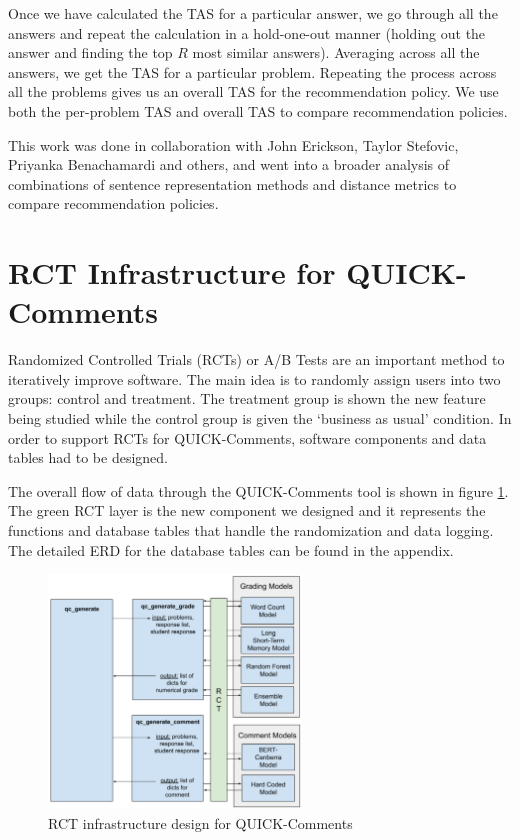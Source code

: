 \documentclass[12pt]{report}
\begin{document}
Once we have calculated the TAS for a particular answer, we go through all the answers and repeat the calculation in a hold-one-out manner (holding out the answer and finding the top $R$ most similar answers). Averaging across all the answers, we get the TAS for a particular problem. Repeating the process across all the problems gives us an overall TAS for the recommendation policy. We use both the per-problem TAS and overall TAS to compare recommendation policies.

This work was done in collaboration with John Erickson, Taylor Stefovic, Priyanka Benachamardi and others, and went into a broader analysis of combinations of sentence representation methods and distance metrics to compare recommendation policies.

\section{RCT Infrastructure for QUICK-Comments}

Randomized Controlled Trials (RCTs) or A/B Tests are an important method to iteratively improve software. The main idea is to randomly assign users into two groups: control and treatment. The treatment group is shown the new feature being studied while the control group is given the `business as usual' condition. In order to support RCTs for QUICK-Comments, software components and data tables had to be designed. 

The overall flow of data through the QUICK-Comments tool is shown in figure \ref{img:rct_overview}. The green RCT layer is the new component we designed and it represents the functions and database tables that handle the randomization and data logging. The detailed ERD for the database tables can be found in the appendix.

\begin{figure}[ht] 
    \centering
    \includegraphics[width=0.6\textwidth]{images/rct_overview.png}
    \caption{RCT infrastructure design for QUICK-Comments}
    \label{img:rct_overview}
\end{figure}
\end{document}
